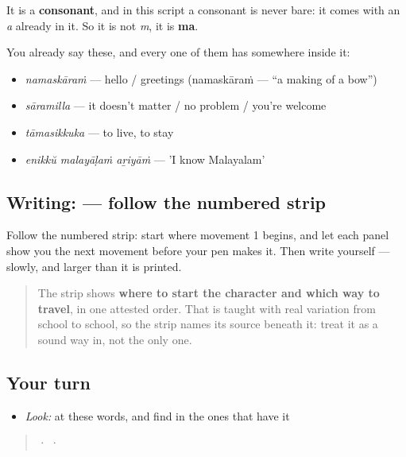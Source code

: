 It is a \textbf{consonant}, and in this script a consonant is never bare: it comes with an \emph{a} already in it. So it is not \emph{m}, it is \textbf{ma}.

You already say these, and every one of them has  somewhere inside it:

\begin{itemize}
\raggedright
  \item \textbf{} \emph{namaskāraṁ} — hello / greetings (namaskāraṁ — \textquotedblleft{}a making of a bow\textquotedblright{})
  \item \textbf{} \emph{sāramilla} — it doesn't matter / no problem / you're welcome
  \item \textbf{} \emph{tāmasikkuka} — to live, to stay
  \item \textbf{  } \emph{enikkŭ malayāḷaṁ aṟiyāṁ} — 'I know Malayalam'
\end{itemize}

\subsection*{Writing:  — follow the numbered strip}

Follow the numbered strip: start where movement 1 begins, and let each panel show you the next movement before your pen makes it. Then write  yourself — slowly, and larger than it is printed.

\begin{quote}
The strip shows \textbf{where to start the character and which way to travel}, in one attested order. That is taught with real variation from school to school, so the strip names its source beneath it: treat it as a sound way in, not the only one.
\end{quote}

\subsection*{Your turn}
\begin{itemize}
\raggedright
  \item \emph{Look:} at these words, and find  in the ones that have it
\end{itemize}

\begin{quote}
  ·    ·  
\end{quote}

